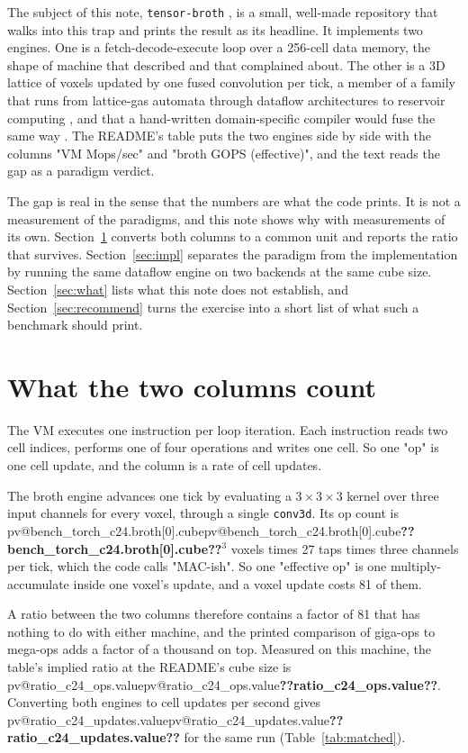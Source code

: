 \documentclass[11pt,a4paper]{article}
\makeatletter
\newcommand{\val}[1]{\ifcsname pv@#1\endcsname\csname pv@#1\endcsname\else\textbf{??#1??}\fi}
\makeatother
\begin{document}
The subject of this note, \texttt{tensor-broth} \citep{tensorbroth}, is a small, well-made
repository that walks into this trap and prints the result as its headline. It implements two
engines. One is a fetch-decode-execute loop over a 256-cell data memory, the shape of machine that
\citet{vonneumann1945} described and that \citet{backus1978} complained about. The other is a 3D
lattice of voxels updated by one fused convolution per tick, a member of a family that runs from
lattice-gas automata \citep{margolus1984} through dataflow architectures
\citep{dennis1975} to reservoir computing \citep{jaeger2004}, and that a hand-written domain-specific
compiler would fuse the same way \citep{ragankelley2013}. The README's table puts the two engines
side by side with the columns "VM Mops/sec" and "broth GOPS (effective)", and the text reads the
gap as a paradigm verdict.

The gap is real in the sense that the numbers are what the code prints. It is not a measurement of
the paradigms, and this note shows why with measurements of its own. Section~\ref{sec:units} converts
both columns to a common unit and reports the ratio that survives.
Section~\ref{sec:impl} separates the paradigm from the implementation by running the same dataflow
engine on two backends at the same cube size. Section~\ref{sec:what} lists what this note does not
establish, and Section~\ref{sec:recommend} turns the exercise into a short list of what such a
benchmark should print.

\section{What the two columns count}
\label{sec:units}

The VM executes one instruction per loop iteration. Each instruction reads two cell indices,
performs one of four operations and writes one cell. So one "op" is one cell update, and the
column is a rate of cell updates.

The broth engine advances one tick by evaluating a $3\times3\times3$ kernel over three input
channels for every voxel, through a single \texttt{conv3d}. Its op count is
\val{bench_torch_c24.broth[0].cube}$^3$ voxels times 27 taps times three channels per tick, which
the code calls "MAC-ish". So one "effective op" is one multiply-accumulate inside one voxel's
update, and a voxel update costs 81 of them.

A ratio between the two columns therefore contains a factor of 81 that has nothing to do with
either machine, and the printed comparison of giga-ops to mega-ops adds a factor of a thousand on
top. Measured on this machine, the table's implied ratio at the README's cube size is
\val{ratio_c24_ops.value}. Converting both engines to cell updates per second gives
\val{ratio_c24_updates.value} for the same run (Table~\ref{tab:matched}).
\end{document}
